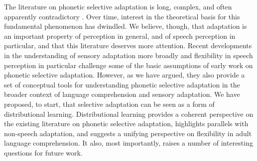 The literature on phonetic selective adaptation is long, complex, and often apparently contradictory \autocites[as summarized by][]{Samuel1986}[and][]{Remez1987}.  Over time, interest in the theoretical basis for this fundamental phenomenon has dwindled.  We believe, though, that adaptation is an important property of perception in general, and of speech perception in particular, and that this literature deserves more attention. Recent developments in the understanding of sensory adaptation more broadly and flexibility in speech perception in particular challenge some of the basic assumptions of early work on phonetic selective adaptation.  However, as we have argued, they also provide a set of conceptual tools for understanding phonetic selective adaptation in the broader context of language comprehension and sensory adaptation.  We have proposed, to start, that selective adaptation can be seen as a form of distributional learning.  Distributional learning provides a coherent perspective on the existing literature on phonetic selective adaptation, highlights parallels with non-speech adaptation, and suggests a unifying perspective on flexibility in adult language comprehension.  It also, most importantly, raises a number of interesting questions for future work.

